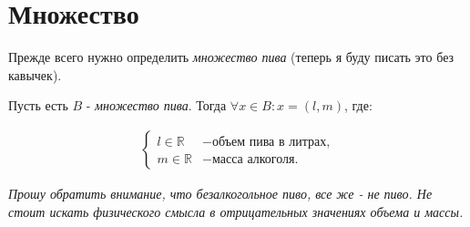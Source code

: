 \section*{Множество}
Прежде всего нужно определить \textit{множество пива} (теперь я буду писать это без кавычек).

Пусть есть $B$ - \textit{множество пива}. Тогда $\forall x \in B: x = (l, m)$, где:

\begin{align}
  \begin{cases}
    l \in \mathbb{R} & - \text{объем пива в литрах,} \\
    m \in \mathbb{R} & - \text{масса алкоголя.}
  \end{cases}
  \label{set_def}
\end{align}

\textit{Прошу обратить внимание, что безалкогольное пиво, все же - не пиво. Не стоит искать физического смысла в отрицательных значениях объема и массы.}
